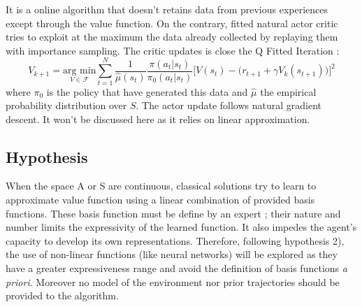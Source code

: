 It is a online algorithm that doesn't retains data from previous experiences except through the
value function. On the contrary, fitted natural actor critic \cite{Melo2008} tries to exploit 
at the maximum the data already collected by replaying them with importance sampling. 
The critic updates is close the Q Fitted Iteration :
\begin{equation}
 V_{k+1} = \underset{V \in \mathcal{F}}{\text{arg min}} \sum_{t=1}^{N} 
 \frac{1}{\hat{\mu}(s_t)} 
 \frac{\pi(a_t|s_t)}{\pi_0(a_t|s_t)}  
 \Big[ V(s_t) - \big( r_{t+1} + \gamma V_k(s_{t+1}) \big) \Big]^2
\end{equation}
where $\pi_0$ is the policy that have generated this data and $\hat{\mu}$ the empirical 
probability distribution over $S$. The actor update follows natural gradient descent. It won't
be discussed here as it relies on linear approximation.

\subsection{Hypothesis}

When the space A or S are continuous, classical solutions try to learn to approximate value function 
using a linear combination of provided basis functions. 
These basis function must be define by an expert ; their nature and number limits the expressivity 
of the learned function. It also impedes the agent's capacity to develop its own representations.
Therefore, following hypothesis 2), the use of non-linear functions (like neural networks) 
will be explored as they have a greater expressiveness range and avoid the definition of basis functions
{\it a priori}. Moreover no model of the environment nor prior trajectories should be provided to the algorithm.





